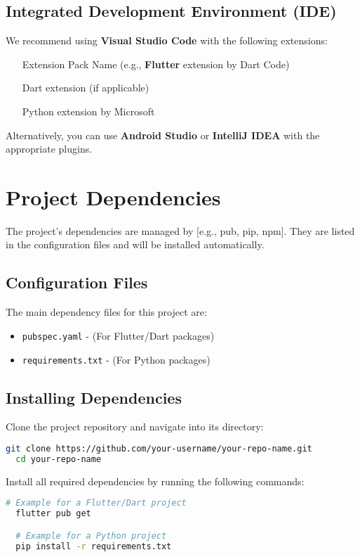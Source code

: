 \documentclass[11pt]{article}
\begin{document}
\subsection{Integrated Development Environment (IDE)}
We recommend using \textbf{Visual Studio Code} with the following extensions:
\begin{itemize}
    \item [Extension Pack Name] (e.g., \textbf{Flutter} extension by Dart Code)
    \item [Dart] extension (if applicable)
    \item [Python] extension by Microsoft
\end{itemize}

Alternatively, you can use \textbf{Android Studio} or \textbf{IntelliJ IDEA} with the appropriate plugins.

\section{Project Dependencies}
The project's dependencies are managed by [e.g., pub, pip, npm]. They are listed in the configuration files and will be installed automatically.

\subsection{Configuration Files}
The main dependency files for this project are:
\begin{itemize}
    \item \texttt{pubspec.yaml} - (For Flutter/Dart packages)
    \item \texttt{requirements.txt} - (For Python packages)
\end{itemize}

\subsection{Installing Dependencies}
Clone the project repository and navigate into its directory:
\begin{lstlisting}[language=bash]
  git clone https://github.com/your-username/your-repo-name.git
  cd your-repo-name
\end{lstlisting}

Install all required dependencies by running the following commands:
\begin{lstlisting}[language=bash]
  # Example for a Flutter/Dart project
  flutter pub get

  # Example for a Python project
  pip install -r requirements.txt
\end{lstlisting}
\end{document}
